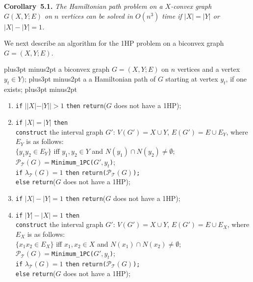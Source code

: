 \documentclass[10pt]{article}
\def\yskip{\penalty-50\vskip3pt plus3pt minus2pt}
\def\y{\yskip}
\begin{document}
{\bigskip
\par\noindent
{\bf Corollary~5.1.} {\it The Hamiltonian path problem on a
$X$-convex graph $G(X,Y;E)$ on $n$ vertices can be solved in
$O(n^3)$ time if $|X|=|Y|$ or $|X|-|Y|=1$.}

\bigskip We next describe an algorithm for the 1HP problem on a
biconvex graph $G=(X,Y;E)$.

\bigskip {} \y {} a biconvex graph $G=(X,Y;E)$ on $n$ vertices and a vertex
$y_t \in Y)$; \y {} a a Hamiltonian path of
$G$ starting at vertex $y_t$, if one exists; \y

\begin{enumerate}
  \item {\tt if} $||X|-|Y||>1$ {\tt then} {\tt return}($G$ does not have a 1HP);
  \item {\tt if} $|X|=|Y|$ {\tt then} \\
         \phantom{if} {\tt construct} the interval graph $G'$: $V(G')=X \cup Y$, $E(G')=E \cup E_Y$, where $E_Y$ is as follows: \\
         \phantom{if} \phantom{if} \phantom{if} $\{y_1y_2 \in E_Y\}$ iff $y_1,y_2 \in Y$ and $N(y_1) \cap N(y_2) \neq \emptyset$;\\
         \phantom{if} $\mathcal{P}_\mathcal{T}(G)=${\tt Minimum\_1PC($G', y_t$)};\\
         \phantom{if} {\tt if} $\lambda_\mathcal{T}(G)=1$ {\tt then} {\tt return($\mathcal{P}_\mathcal{T}(G)$);}\\
         \phantom{if} {\tt else} {\tt return}($G$ does not have a 1HP);
  \item {\tt if} $|X|-|Y|=1$ {\tt then} {\tt return}($G$ does not have a 1HP);
  \item {\tt if} $|Y|-|X|=1$ {\tt then} \\
         \phantom{if} {\tt construct} the interval graph $G'$: $V(G')=X \cup Y$, $E(G')=E \cup E_X$, where $E_X$ is as follows: \\
         \phantom{if} \phantom{if} $\{x_1x_2 \in E_X\}$ iff $x_1,x_2 \in X$ and $N(x_1) \cap N(x_2) \neq \emptyset$;\\
         \phantom{if} $\mathcal{P}_\mathcal{T}(G)=${\tt Minimum\_1PC($G', y_t$)};\\
         \phantom{if} {\tt if} $\lambda_\mathcal{T}(G)=1$ {\tt then} {\tt return($\mathcal{P}_\mathcal{T}(G)$);}\\
         \phantom{if} {\tt else} {\tt return}($G$ does not have a 1HP);
  \end{enumerate}


}
\end{document}
